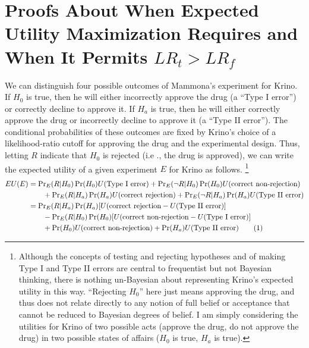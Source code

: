 \documentclass{article}
\theoremstyle{definition}
\newcommand\numberthis{\addtocounter{equation}{1}\tag{\theequation}}
\begin{document}



\appendix

\section{Proofs About When Expected Utility Maximization Requires and When It Permits $LR_t>LR_f$}\label{app:proof}

We can distinguish four possible outcomes of Mammona's experiment for Krino.
If $H_0$ is true, then he will either incorrectly approve the drug (a ``Type I error'') or correctly decline to approve it.
If $H_a$ is true, then he will either correctly approve the drug or incorrectly decline to approve it (a ``Type II error'').
The conditional probabilities of these outcomes are fixed by Krino's choice of a likelihood-ratio cutoff for approving the drug and the experimental design.
Thus, letting $R$ indicate that $H_0$ is rejected (i.e
., the drug is approved), we can write the expected utility of a given experiment $E$ for Krino as follows.%
\footnote{%
Although the concepts of testing and rejecting hypotheses and of making Type I and Type II errors are central to frequentist but not Bayesian thinking, there is nothing un-Bayesian about representing Krino's expected utility in this way.
``Rejecting $H_0$'' here just means approving the drug, and thus does not relate directly to any notion of full belief or acceptance that cannot be reduced to Bayesian degrees of belief.
I am simply considering the utilities for Krino of two possible acts (approve the drug, do not approve the drug) in two possible states of affairs ($H_0$ is true, $H_a$ is true).
}
\begin{align*}
EU(E)&=\mbox{Pr}_E(R|H_0)\Pr(H_0)U(\mbox{Type I error})+\mbox{Pr}_E(\neg R|H_0)\Pr(H_0)U(\mbox{correct non-rejection})\\
&\qquad +\mbox{Pr}_E(R|H_a)\Pr(H_a)U(\mbox{correct rejection})+\mbox{Pr}_E(\neg R|H_a)\Pr(H_a)U(\mbox{Type II error})\\
&= \mbox{Pr}_E(R|H_a)\Pr(H_a)[U(\mbox{correct rejection}-U(\mbox{Type II error})]\\
& \qquad-\mbox{Pr}_E(R|H_0)\Pr(H_0)[U(\mbox{correct non-rejection}-U(\mbox{Type I error})]\\
& \qquad +\Pr(H_0)U(\mbox{correct non-rejection})+\Pr(H_a)U(\mbox{Type II error}) \numberthis \label{eq:eu}
\end{align*}
\end{document}
